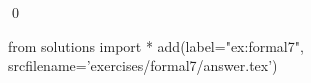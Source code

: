 
\begin{ex} 
  \label{ex:formal7}
  
  \qed
\end{ex} 
\begin{python0}
from solutions import *
add(label="ex:formal7",
    srcfilename='exercises/formal7/answer.tex') 
\end{python0}
